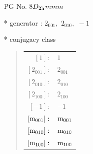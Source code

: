 \documentclass[fleqn,8pt]{jsarticle}
\begin{document}
\setcounter{MaxMatrixCols}{32}

\renewcommand{\tablename}{Table~}
\renewcommand{\figurename}{Figure~}
\begin{center}
\LARGE
PG No. 8\quad$D_{\rm 2h}$\quad$mmm$\quad[ orthorhombic ]
\end{center}

* generator : $2{}_{001},\,\,2{}_{010},\,\,-1$

* conjugacy class
\begin{quote}
\begin{tabular}{rl}
$ [1]: $ & $ 1 $ \\
$ [2{}_{001}]: $ & $ 2{}_{001} $ \\
$ [2{}_{010}]: $ & $ 2{}_{010} $ \\
$ [2{}_{100}]: $ & $ 2{}_{100} $ \\
$ [-1]: $ & $ -1 $ \\
$ [{\rm m}_{001}]: $ & $ {\rm m}_{001} $ \\
$ [{\rm m}_{010}]: $ & $ {\rm m}_{010} $ \\
$ [{\rm m}_{100}]: $ & $ {\rm m}_{100} $
\end{tabular}
\end{quote}
\end{document}
